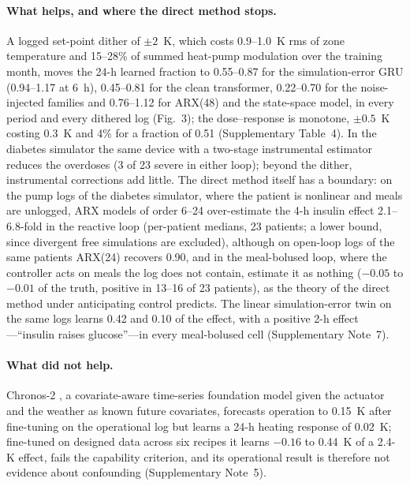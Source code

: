 \documentclass[11pt]{article}
\begin{document}
\paragraph{What helps, and where the direct method stops.} A logged set-point dither of $\pm2$~K, which costs 0.9--1.0~K rms of zone temperature and 15--28\% of summed heat-pump modulation over the training month, moves the 24-h learned fraction to 0.55--0.87 for the simulation-error GRU (0.94--1.17 at 6~h), 0.45--0.81 for the clean transformer, 0.22--0.70 for the noise-injected families and 0.76--1.12 for ARX(48) and the state-space model, in every period and every dithered log (Fig.~3); the dose--response is monotone, $\pm0.5$~K costing 0.3~K and 4\% for a fraction of 0.51 (Supplementary Table~4). In the diabetes simulator the same device with a two-stage instrumental estimator \citep{angrist2009} reduces the overdoses (3 of 23 severe in either loop); beyond the dither, instrumental corrections add little. The direct method itself has a boundary: on the pump logs of the diabetes simulator, where the patient is nonlinear and meals are unlogged, ARX models of order 6--24 over-estimate the 4-h insulin effect 2.1--6.8-fold in the reactive loop (per-patient medians, 23 patients; a lower bound, since divergent free simulations are excluded), although on open-loop logs of the same patients ARX(24) recovers 0.90, and in the meal-bolused loop, where the controller acts on meals the log does not contain, estimate it as nothing ($-0.05$ to $-0.01$ of the truth, positive in 13--16 of 23 patients), as the theory of the direct method under anticipating control predicts. The linear simulation-error twin on the same logs learns 0.42 and 0.10 of the effect, with a positive 2-h effect---``insulin raises glucose''---in every meal-bolused cell (Supplementary Note~7).

\paragraph{What did not help.} Chronos-2 \citep{chronos2}, a covariate-aware time-series foundation model given the actuator and the weather as known future covariates, forecasts operation to 0.15~K after fine-tuning on the operational log but learns a 24-h heating response of 0.02~K; fine-tuned on designed data across six recipes it learns $-0.16$ to 0.44~K of a 2.4-K effect, fails the capability criterion, and its operational result is therefore not evidence about confounding (Supplementary Note~5).
\end{document}
